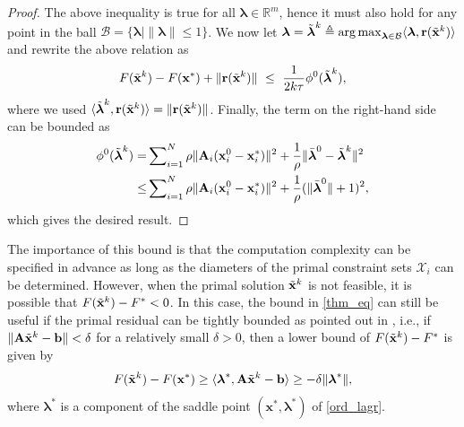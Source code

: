 \documentclass[doublecolumn]{IEEEtran}
\begin{document}
\begin{proof}
The above inequality is true for all ${\boldsymbol{\lambda}} \in \mathbb{R}^m$, hence it must also hold for any point in the ball $\mathcal{B} = \{{\boldsymbol{\lambda}} \mid \|{\boldsymbol{\lambda}}\| \le 1\}$. We now let ${\boldsymbol{\lambda}} = \tilde{\boldsymbol{\lambda}}^k \triangleq \operatorname*{arg\,max}_{{\boldsymbol{\lambda}} \in \mathcal{B}} \langle {\boldsymbol{\lambda}}, { {\bf r} }( { \tilde{\bf x} }^k  )\rangle$ and rewrite the above relation as
\begin{align*}
 F( { \tilde{\bf x} }^k  )  - F({ {\bf x} }^*) +  \|{ {\bf r} }( { \tilde{\bf x} }^k  )\| ~\leq~ \frac{1}{2k\tau}   \phi^0(\tilde{\boldsymbol{\lambda}}^k),
\end{align*}
where we used $\langle \tilde{\boldsymbol{\lambda}}^k, { {\bf r} }( { \tilde{\bf x} }^k  )\rangle = \|{ {\bf r} }( { \tilde{\bf x} }^k  )\|$.
Finally, the term on the right-hand side can be bounded as
\begin{align*}
\phi^0(\tilde{\boldsymbol{\lambda}}^k) = &\sum\nolimits_{i=1}^N {\rho}\|{ {\bf A} }_i({ {\bf x} }_i^0-{ {\bf x} }_i^*)\|^2 +\frac{1}{\rho}\|\bar{\boldsymbol{\lambda}}^0-\tilde{\boldsymbol{\lambda}}^k\|^2\\
\le &\sum\nolimits_{i=1}^N {\rho}\|{ {\bf A} }_i({ {\bf x} }_i^0-{ {\bf x} }_i^*)\|^2 +\frac{1}{\rho}(\|\bar{\boldsymbol{\lambda}}^0\|+1)^2,
\end{align*}
which gives the desired result.
\end{proof}
\vspace{3pt}

The importance of this bound is that
the computation complexity can be specified in advance as long as the diameters of the primal constraint sets $\mathcal{X}_i$ can be determined.
However, when the primal solution ${ \tilde{\bf x} }^k$ is not feasible, it is possible that $F({ \tilde{\bf x} }^k) -F^* < 0$.
In this case, the bound in \eqref{thm_eq} can  still be useful if the primal residual can be tightly bounded
as pointed out in \cite{LanDBnd}, i.e., if $\|\mathbf{A}{ \tilde{\bf x} }^k-\mathbf{b}\| < \delta$ for a relatively small $\delta >0$,
then a lower bound of $F({ \tilde{\bf x} }^k) -F^*$ is given by
\begin{align*}
F({ \tilde{\bf x} }^k) -  F({ {\bf x} }^*)  \ge \langle \boldsymbol{\lambda}^*, \mathbf{A}{ \tilde{\bf x} }^k-\mathbf{b}\rangle \ge - \delta\|\boldsymbol{\lambda}^*\|,
\end{align*}
where $\boldsymbol{\lambda}^*$ is a component of the saddle point $(\mathbf{x}^*,\boldsymbol{\lambda}^*)$ of \eqref{ord_lagr}.
\end{document}

